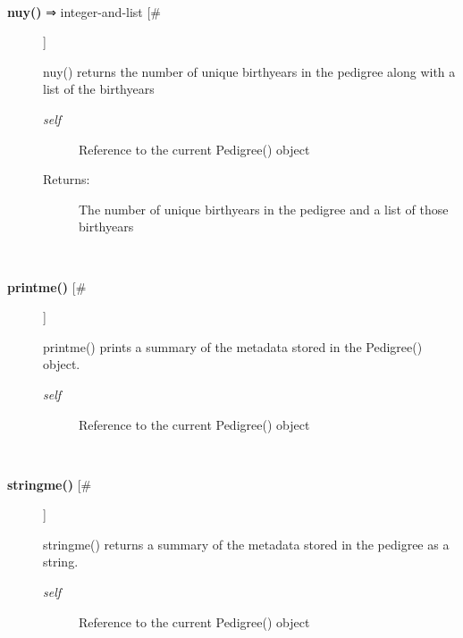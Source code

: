 \begin{description}
\begin{description}
\end{description}
\\ 

\item[\textbf{nuy()}
 ⇒ integer-and-list [\#]]

 nuy() returns the number of unique birthyears in the pedigree along with a list of the birthyears
\begin{description}
\item[\emph{self}
] Reference to the current Pedigree() object
\item[Returns:] The number of unique birthyears in the pedigree and a list of those birthyears

\end{description}
\\ 

\item[\textbf{printme()}
 [\#]]

 printme() prints a summary of the metadata stored in the Pedigree() object.
\begin{description}
\item[\emph{self}
] Reference to the current Pedigree() object

\end{description}
\\ 

\item[\textbf{stringme()}
 [\#]]

 stringme() returns a summary of the metadata stored in the pedigree as a string.
\begin{description}
\item[\emph{self}
] Reference to the current Pedigree() object

\end{description}
\\ 


\end{description}

